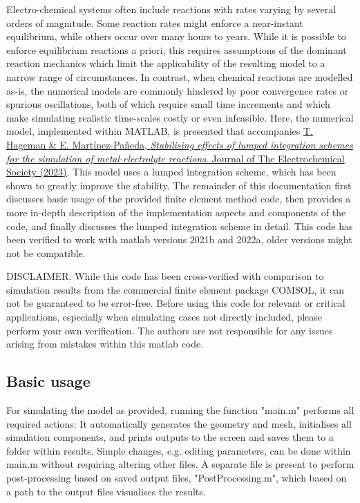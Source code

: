 \documentclass[3p]{elsarticle} %
\newcommand{\citeMe}{\href{http://www.doi.org/10.1149/1945-7111/acb971}{T. Hageman \& E. Martínez-Pañeda, \textit{Stabilising effects of lumped integration schemes for the simulation of metal-electrolyte reactions}. Journal of The Electrochemical Society (2023)}}
\begin{document}
Electro-chemical systems often include reactions with rates varying by several orders of magnitude. Some reaction rates might enforce a near-instant equilibrium, while others occur over many hours to years. While it is possible to enforce equilibrium reactions a priori, this requires assumptions of the dominant reaction mechanics which limit the applicability of the resulting model to a narrow range of circumstances. In contrast, when chemical reactions are modelled as-is, the numerical models are commonly hindered by poor convergence rates or spurious oscillations, both of which require small time increments and which make simulating realistic time-scales costly or even infeasible. Here, the numerical model, implemented within MATLAB, is presented that accompanies \citeMe{}. This model uses a lumped integration scheme, which has been shown to greatly improve the stability. The remainder of this documentation first discusses basic usage of the provided finite element method code, then provides a more in-depth description of the implementation aspects and components of the code, and finally discusses the lumped integration scheme in detail. This code has been verified to work with matlab versions 2021b and 2022a, older versions might not be compatible. 

DISCLAIMER: While this code has been cross-verified with comparison to simulation results from the commercial finite element package COMSOL, it can not be guaranteed to be error-free. Before using this code for relevant or critical applications, especially when simulating cases not directly included, please perform your own verification. The authors are not responsible for any issues arising from mistakes within this matlab code.

\subsection{Basic usage}
For simulating the model as provided, running the function "main.m" performs all required actions: It automatically generates the geometry and mesh, initialises all simulation components, and prints outputs to the screen and saves them to a folder within results. Simple changes, e.g. editing parameters, can be done within main.m without requiring altering other files. A separate file is present to perform post-processing based on saved output files, "PostProcessing.m", which based on a path to the output files visualises the results.
\end{document}
